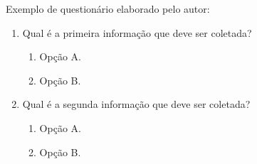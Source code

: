 \label{ap:questionario}

Exemplo de questionário elaborado pelo autor:

\begin{enumerate}
  \item Qual é a primeira informação que deve ser coletada?
  \begin{enumerate}
    \item Opção A.
    \item Opção B.
  \end{enumerate}

  \item Qual é a segunda informação que deve ser coletada?
  \begin{enumerate}
    \item Opção A.
    \item Opção B.
  \end{enumerate}
\end{enumerate}
